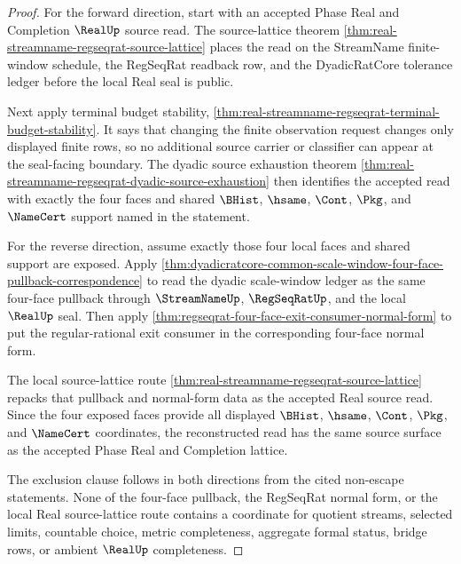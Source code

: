 \begin{proof}
For the forward direction, start with an accepted Phase Real and Completion
$\RealUp$ source read. The source-lattice theorem
\autoref{thm:real-streamname-regseqrat-source-lattice} places the read on the
StreamName finite-window schedule, the RegSeqRat readback row, and the
DyadicRatCore tolerance ledger before the local Real seal is public.

Next apply terminal budget stability,
\autoref{thm:real-streamname-regseqrat-terminal-budget-stability}. It says
that changing the finite observation request changes only displayed finite
rows, so no additional source carrier or classifier can appear at the
seal-facing boundary. The dyadic source exhaustion theorem
\autoref{thm:real-streamname-regseqrat-dyadic-source-exhaustion} then
identifies the accepted read with exactly the four faces and shared
$\BHist$, $\hsame$, $\Cont$, $\Pkg$, and $\NameCert$ support named in the
statement.

For the reverse direction, assume exactly those four local faces and shared
support are exposed. Apply
\autoref{thm:dyadicratcore-common-scale-window-four-face-pullback-correspondence}
to read the dyadic scale-window ledger as the same four-face pullback through
$\StreamNameUp$, $\RegSeqRatUp$, and the local $\RealUp$ seal. Then apply
\autoref{thm:regseqrat-four-face-exit-consumer-normal-form} to put the
regular-rational exit consumer in the corresponding four-face normal form.

The local source-lattice route
\autoref{thm:real-streamname-regseqrat-source-lattice} repacks that pullback
and normal-form data as the accepted Real source read. Since the four exposed
faces provide all displayed $\BHist$, $\hsame$, $\Cont$, $\Pkg$, and
$\NameCert$ coordinates, the reconstructed read has the same source surface as
the accepted Phase Real and Completion lattice.

The exclusion clause follows in both directions from the cited non-escape
statements. None of the four-face pullback, the RegSeqRat normal form, or the
local Real source-lattice route contains a coordinate for quotient streams,
selected limits, countable choice, metric completeness, aggregate formal
status, bridge rows, or ambient $\RealUp$ completeness.
\end{proof}
